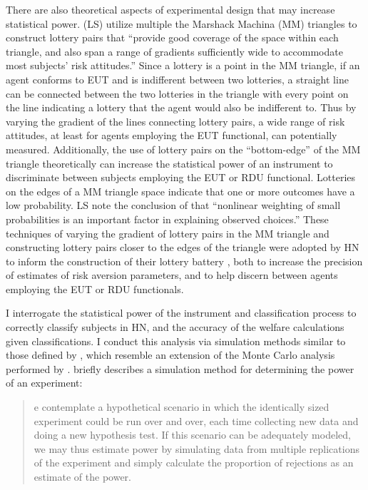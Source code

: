 \documentclass[../main.tex]{subfiles}
\begin{document}
There are also theoretical aspects of experimental design that may increase statistical power.
\textcite{Loomes1998} (LS) utilize multiple the Marshack Machina (MM) triangles to construct lottery pairs that \enquote{provide good coverage of the space within each triangle, and also span a range of gradients sufficiently wide to accommodate most subjects' risk attitudes.}
Since a lottery is a point in the MM triangle, if an agent conforms to EUT and is indifferent between two lotteries, a straight line can be connected between the two lotteries in the triangle with every point on the line indicating a lottery that the agent would also be indifferent to.
Thus by varying the gradient of the lines connecting lottery pairs, a wide range of risk attitudes, at least for agents employing the EUT functional, can potentially measured.
Additionally, the use of lottery pairs on the \enquote{bottom-edge} of the MM triangle theoretically can increase the statistical power of an instrument to discriminate between subjects employing the EUT or RDU functional.
Lotteries on the edges of a MM triangle space indicate that one or more outcomes have a low probability.
LS \parencite*[595]{Loomes1998} note the conclusion of \textcite[1285]{Harless1994} that \enquote{nonlinear weighting of small probabilities is an important factor in explaining observed choices.}
These techniques of varying the gradient of lottery pairs in the MM triangle and constructing lottery pairs closer to the edges of the triangle were adopted by HN to inform the construction of their lottery battery \parencite*[99]{Harrison2016}, both to increase the precision of estimates of risk aversion parameters, and to help discern between agents employing the EUT or RDU functionals.

I interrogate the statistical power of the instrument and classification process to correctly classify subjects in HN, and the accuracy of the welfare calculations given classifications.
I conduct this analysis via simulation methods similar to those defined by \textcite{Feiveson2002}, which resemble an extension of the Monte Carlo analysis performed by \textcite{Wilcox2015}.
\textcite[108]{Feiveson2002} briefly describes a simulation method for determining the power of an experiment:

\blockquote{
e contemplate a hypothetical scenario in which the identically sized experiment could be run over and over, each time collecting new data and doing a new hypothesis test. 
If this scenario can be adequately modeled, we may thus estimate power by simulating data from multiple replications of the experiment and simply calculate the proportion of rejections  as an estimate of the power.
}
\end{document}
